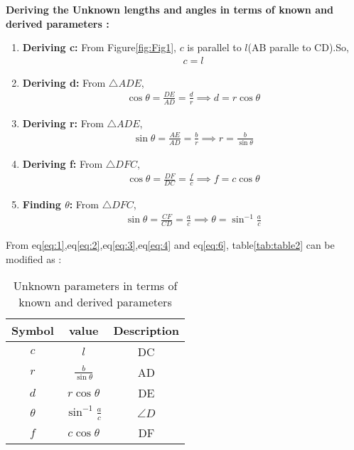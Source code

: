 \textbf{Deriving the Unknown lengths and angles in terms of known and derived parameters :}\\
\begin{enumerate}
	\item \textbf{Deriving c:}
		From Figure\ref{fig:Fig1}, $c$ is  parallel to $l$(AB paralle to CD).So,
		\begin{align}
			c = l
			\label{eq:1}
		\end{align}
	\item \textbf{Deriving d:}
		From $\triangle{ADE}$,
		\begin{align}
			\cos{\theta} = \frac{DE}{AD} = \frac{d}{r}
			\implies d = r\cos{\theta}
			\label{eq:2}
		\end{align}
	\item \textbf{Deriving r:}
		From $\triangle{ADE}$,
		\begin{align}
			\sin{\theta} = \frac{AE}{AD} = \frac{b}{r}
			\implies r = \frac{b}{\sin{\theta}}
			\label{eq:3}
		\end{align}
	\item \textbf{Deriving f:}
		From $\triangle{DFC}$,
		\begin{align}
			\cos{\theta} = \frac{DF}{DC} = \frac{f}{c}
			\implies f = c\cos{\theta}
			\label{eq:4}
		\end{align}
	\item \textbf{Finding $\theta$:}
		From $\triangle{DFC}$,
		\begin{align}
			\sin{\theta} = \frac{CF}{CD} = \frac{a}{c}
			\implies \theta = \sin^{-1}\frac{a}{c}
			\label{eq:6}
		\end{align}
\end{enumerate}
From eq\ref{eq:1},eq\ref{eq:2},eq\ref{eq:3},eq\ref{eq:4} and eq\ref{eq:6}, table\ref{tab:table2} can be modified as :\\
\begin{table}[h]
	\centering
\begin{tabular}{|c|c|c|}
\hline
Symbol & value & Description\\
\hline
$c$ & $l$ & DC\\
\hline
$r$ & $\frac{b}{\sin{\theta}}$ & AD \\
\hline
$d$ & $r\cos{\theta}$ & DE \\
\hline
$\theta$ & $\sin^{-1}\frac{a}{c}$ & $\angle{D}$ \\
\hline
$f$ & $c\cos{\theta}$ & DF\\
\hline
\end{tabular}
	\caption{Unknown parameters in terms of known and derived parameters}
	\label{tab:table4}
\end{table}\\
